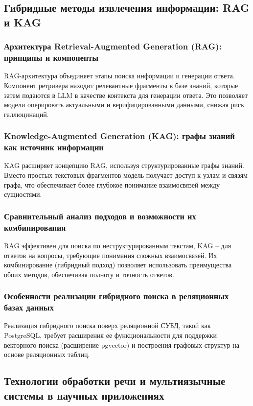 \documentclass[a4paper,14pt]{extarticle}
\begin{document}
	\subsection{Гибридные методы извлечения информации: RAG и KAG}
	
	\subsubsection{Архитектура Retrieval-Augmented Generation (RAG): принципы и компоненты}
	RAG-архитектура объединяет этапы поиска информации и генерации ответа. Компонент ретривера находит релевантные фрагменты в базе знаний, которые затем подаются в LLM в качестве контекста для генерации ответа. Это позволяет модели оперировать актуальными и верифицированными данными, снижая риск галлюцинаций.
	
	\subsubsection{Knowledge-Augmented Generation (KAG): графы знаний как источник информации}
	KAG расширяет концепцию RAG, используя структурированные графы знаний. Вместо простых текстовых фрагментов модель получает доступ к узлам и связям графа, что обеспечивает более глубокое понимание взаимосвязей между сущностями.
	
	\subsubsection{Сравнительный анализ подходов и возможности их комбинирования}
	RAG эффективен для поиска по неструктурированным текстам, KAG – для ответов на вопросы, требующие понимания сложных взаимосвязей. Их комбинирование (гибридный подход) позволяет использовать преимущества обоих методов, обеспечивая полноту и точность ответов.
	
	\subsubsection{Особенности реализации гибридного поиска в реляционных базах данных}
	Реализация гибридного поиска поверх реляционной СУБД, такой как PostgreSQL, требует расширения ее функциональности для поддержки векторного поиска (расширение pgvector) и построения графовых структур на основе реляционных таблиц.
	
	\subsection{Технологии обработки речи и мультиязычные системы в научных приложениях}
	
\end{document}
